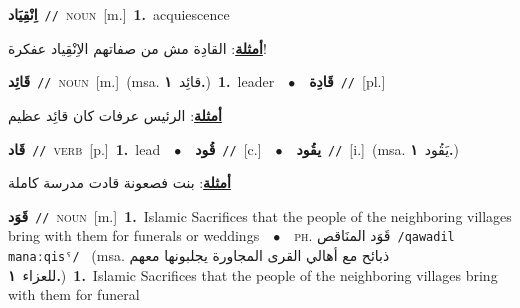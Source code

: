 \documentclass[10pt,a4paper,twoside]{article} %
\begin{document}
\begin{multicols}{2}
{\setlength\topsep{0pt}\textbf{\foreignlanguage{arabic}{اِنْقِيَاد}}\ {\color{gray}\texttt{//}\color{black}}\ \textsc{noun}\ [m.]\ \textbf{1.}~acquiescence\  \begin{flushright}\color{gray}\foreignlanguage{arabic}{\textbf{\underline{\foreignlanguage{arabic}{أمثلة}}}: القادِة مش من صفاتهم الاِنْقِياد عفكرة!}\end{flushright}\color{black}} \vspace{2mm}

{\setlength\topsep{0pt}\textbf{\foreignlanguage{arabic}{قَائِد}}\ {\color{gray}\texttt{//}\color{black}}\ \textsc{noun}\ [m.]\ \color{gray}(msa. \foreignlanguage{arabic}{قائِد}~\foreignlanguage{arabic}{\textbf{١.}})\color{black}\ \textbf{1.}~leader\ \ $\bullet$\ \ \setlength\topsep{0pt}\textbf{\foreignlanguage{arabic}{قَادِة}}\ {\color{gray}\texttt{//}\color{black}}\ [pl.]\  \begin{flushright}\color{gray}\foreignlanguage{arabic}{\textbf{\underline{\foreignlanguage{arabic}{أمثلة}}}: الرئيس عرفات كان قائِد عظيم}\end{flushright}\color{black}} \vspace{2mm}

{\setlength\topsep{0pt}\textbf{\foreignlanguage{arabic}{قَاد}}\ {\color{gray}\texttt{//}\color{black}}\ \textsc{verb}\ [p.]\ \textbf{1.}~lead\ \ $\bullet$\ \ \setlength\topsep{0pt}\textbf{\foreignlanguage{arabic}{قُود}}\ {\color{gray}\texttt{//}\color{black}}\ [c.]\ \ $\bullet$\ \ \setlength\topsep{0pt}\textbf{\foreignlanguage{arabic}{يقُود}}\ {\color{gray}\texttt{//}\color{black}}\ [i.]\ \color{gray}(msa. \foreignlanguage{arabic}{يَقُود}~\foreignlanguage{arabic}{\textbf{١.}})\color{black}\  \begin{flushright}\color{gray}\foreignlanguage{arabic}{\textbf{\underline{\foreignlanguage{arabic}{أمثلة}}}: بنت فصعونة قادت مدرسة كاملة}\end{flushright}\color{black}} \vspace{2mm}

{\setlength\topsep{0pt}\textbf{\foreignlanguage{arabic}{قَوَد}}\ {\color{gray}\texttt{//}\color{black}}\ \textsc{noun}\ [m.]\ \textbf{1.}~Islamic Sacrifices that the people of the neighboring villages bring with them for funerals or weddings\ \ $\bullet$\ \ \textsc{ph.} \color{gray} \foreignlanguage{arabic}{قَوَد المنَاقص}\color{black}\ {\color{gray}\texttt{/{\sffamily qawadil manaːqisˤ}/}\color{black}}\ \color{gray} (msa. \foreignlanguage{arabic}{ذبائح مع أهالي القرى المجاورة يجلبونها معهم للعزاء}~\foreignlanguage{arabic}{\textbf{١.}})\color{black}\ \textbf{1.}~Islamic Sacrifices that the people of the neighboring villages bring with them for funeral\ } \vspace{2mm}


\end{multicols}
\end{document}
